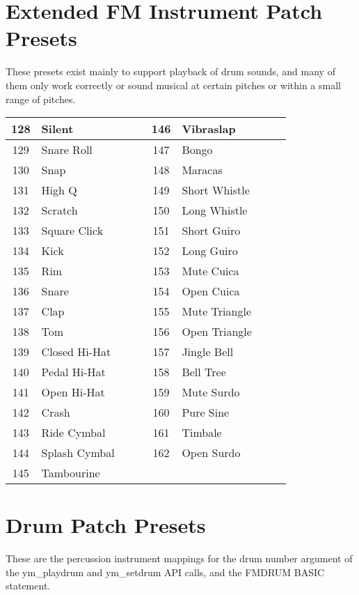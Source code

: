 \clearpage

\section {Extended FM Instrument Patch Presets}

These presets exist mainly to support playback of drum sounds, and many of them
only work correctly or sound musical at certain pitches or within a small range
of pitches.\\

\begin{tabular}{|c|p{0.4\linewidth}|c|p{0.4\linewidth}|}
	\hline
	128 & Silent & 146 & Vibraslap \\ \hline
	129 & Snare Roll & 147 & Bongo \\ \hline
	130 & Snap & 148 & Maracas \\ \hline
	131 & High Q & 149 & Short Whistle \\ \hline
	132 & Scratch & 150 & Long Whistle \\ \hline
	133 & Square Click & 151 & Short Guiro \\ \hline
	134 & Kick & 152 & Long Guiro \\ \hline
	135 & Rim & 153 & Mute Cuica \\ \hline
	136 & Snare & 154 & Open Cuica \\ \hline
	137 & Clap & 155 & Mute Triangle \\ \hline
	138 & Tom & 156 & Open Triangle \\ \hline
	139 & Closed Hi-Hat & 157 & Jingle Bell \\ \hline
	140 & Pedal Hi-Hat & 158 & Bell Tree \\ \hline
	141 & Open Hi-Hat & 159 & Mute Surdo \\ \hline
	142 & Crash & 160 & Pure Sine \\ \hline
	143 & Ride Cymbal & 161 & Timbale \\ \hline
	144 & Splash Cymbal & 162 & Open Surdo \\ \hline
	145 & Tambourine & & \\ \hline
\end{tabular}

\clearpage

\section {Drum Patch Presets}

These are the percussion instrument mappings for the drum number argument of
the {\ttfamily ym\_playdrum} and {\ttfamily ym\_setdrum} API calls, and the
{\ttfamily FMDRUM} BASIC statement.\\


